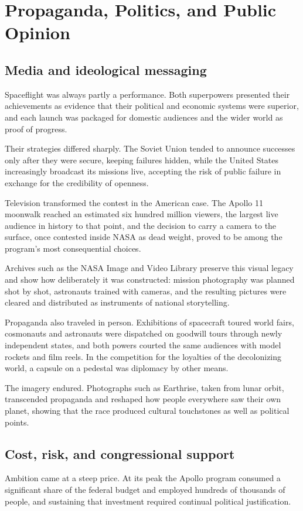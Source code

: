 \section{Propaganda, Politics, and Public Opinion}

\subsection{Media and ideological messaging}
Spaceflight was always partly a performance. Both superpowers presented their achievements as evidence that their political and economic systems were superior, and each launch was packaged for domestic audiences and the wider world as proof of progress.

Their strategies differed sharply. The Soviet Union tended to announce successes only after they were secure, keeping failures hidden, while the United States increasingly broadcast its missions live, accepting the risk of public failure in exchange for the credibility of openness.

Television transformed the contest in the American case. The Apollo 11 moonwalk reached an estimated six hundred million viewers, the largest live audience in history to that point, and the decision to carry a camera to the surface, once contested inside NASA as dead weight, proved to be among the program's most consequential choices.

Archives such as the NASA Image and Video Library preserve this visual legacy and show how deliberately it was constructed: mission photography was planned shot by shot, astronauts trained with cameras, and the resulting pictures were cleared and distributed as instruments of national storytelling.

Propaganda also traveled in person. Exhibitions of spacecraft toured world fairs, cosmonauts and astronauts were dispatched on goodwill tours through newly independent states, and both powers courted the same audiences with model rockets and film reels. In the competition for the loyalties of the decolonizing world, a capsule on a pedestal was diplomacy by other means.

The imagery endured. Photographs such as Earthrise, taken from lunar orbit, transcended propaganda and reshaped how people everywhere saw their own planet, showing that the race produced cultural touchstones as well as political points. \cite{cadbury2006} \cite{mcdougall1985} \cite{nasaimages}

\subsection{Cost, risk, and congressional support}
Ambition came at a steep price. At its peak the Apollo program consumed a significant share of the federal budget and employed hundreds of thousands of people, and sustaining that investment required continual political justification.

